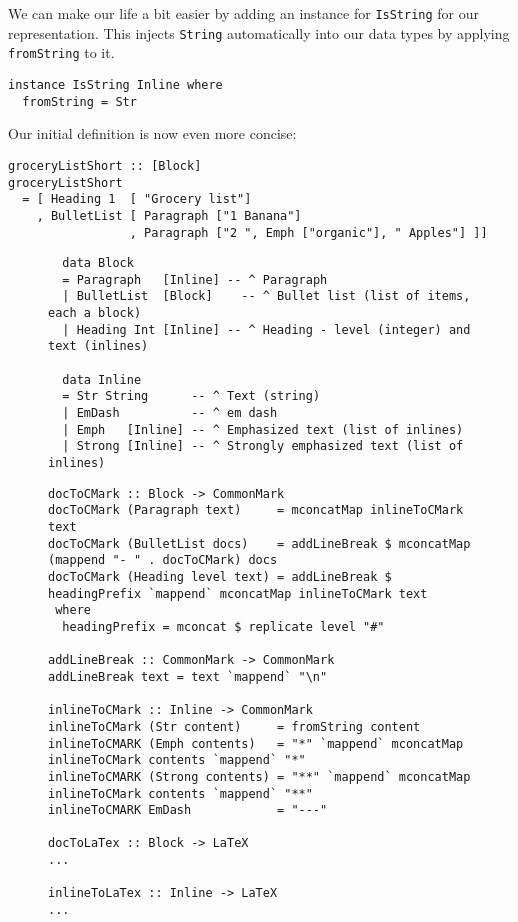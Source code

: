 \documentclass[format=acmsmall, review=true, screen=true]{acmart}
\begin{document}
We can make our life a bit easier by adding an instance for \texttt{IsString} for our
representation. This injects \texttt{String} automatically into our data types by
applying \texttt{fromString} to it.

\begin{lstlisting}
instance IsString Inline where
  fromString = Str
\end{lstlisting}


Our initial definition is now even more concise:

\begin{lstlisting}
groceryListShort :: [Block]
groceryListShort
  = [ Heading 1  [ "Grocery list"]
    , BulletList [ Paragraph ["1 Banana"]
                 , Paragraph ["2 ", Emph ["organic"], " Apples"] ]]
\end{lstlisting}

\begin{figure}
\begin{lstlisting}
  data Block
  = Paragraph   [Inline] -- ^ Paragraph
  | BulletList  [Block]    -- ^ Bullet list (list of items, each a block)
  | Heading Int [Inline] -- ^ Heading - level (integer) and text (inlines)
  
  data Inline
  = Str String      -- ^ Text (string)
  | EmDash          -- ^ em dash
  | Emph   [Inline] -- ^ Emphasized text (list of inlines)
  | Strong [Inline] -- ^ Strongly emphasized text (list of inlines)
\end{lstlisting}
\end{figure}

\begin{figure}
\begin{lstlisting}
docToCMark :: Block -> CommonMark
docToCMark (Paragraph text)     = mconcatMap inlineToCMark text
docToCMark (BulletList docs)    = addLineBreak $ mconcatMap (mappend "- " . docToCMark) docs
docToCMark (Heading level text) = addLineBreak $ headingPrefix `mappend` mconcatMap inlineToCMark text
 where
  headingPrefix = mconcat $ replicate level "#"

addLineBreak :: CommonMark -> CommonMark
addLineBreak text = text `mappend` "\n"

inlineToCMark :: Inline -> CommonMark
inlineToCMark (Str content)     = fromString content
inlineToCMARK (Emph contents)   = "*" `mappend` mconcatMap inlineToCMark contents `mappend` "*"
inlineToCMARK (Strong contents) = "**" `mappend` mconcatMap inlineToCMark contents `mappend` "**"
inlineToCMARK EmDash            = "---"

docToLaTex :: Block -> LaTeX
...

inlineToLaTex :: Inline -> LaTeX
...
\end{lstlisting}
\end{figure}
\end{document}
